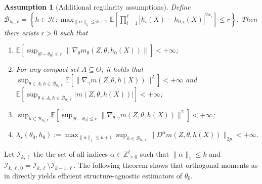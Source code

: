\documentclass{article}
\def\gB{{\mathcal{B}}}
\def\gH{{\mathcal{H}}}
\def\gI{{\mathcal{I}}}
\newcommand{\E}{\mathbb{E}}
\newtheorem{assumption}{Assumption}[section]
\begin{document}
\begin{assumption}[Additional regularity assumptions]
    \label{asmp:higher-order-regularity}
    Define $\gB_{h_0,r} = \left\{h\in\gH: \max_{\|\alpha\|_1\leq k+1} \E\left[ \prod_{i=1}^{\ell} |h_i(X)-h_{0,i}(X)|^{2\alpha_i} \right] \leq r \right\}$. Then there exists $r>0$ such that
    \begin{enumerate}[(1).]
        \item $\E\left[ \sup_{|\theta-\theta_0|\leq r} \left\|\nabla_{\theta} m_{\theta}(Z,\theta,h_0(X))\right\| \right] < +\infty$;
        \item For any compact set $A\subseteq\Theta$, it holds that $\sup_{\theta\in A, h\in\gB_{h_0,r}} \E\left[ \|\nabla_{\gamma} m(Z,\theta,h(X))\|^2 \right] < +\infty$ and $\E\left[ \sup_{\theta\in A, h\in\gB_{h_0,r}} \left| m(Z,\theta,h(X))\right| \right] < +\infty$;
        \item $\sup_{h\in\gB_{h_0,r}}\E\left[ \sup_{|\theta-\theta_0|\leq r} \|\nabla_{\theta,\gamma} m(Z,\theta,h(X))\|^2 \right] < +\infty$;
        \item $\lambda_{\star}(\theta_0,h_0) := \max_{\|\alpha\|_1\leq k+1}\sup_{h\in\gB_{h_0,r}} \|D^{\alpha}m(Z,\theta,h(X))\|_{2p} < +\infty$.
    \end{enumerate}
\end{assumption}

Let $\gI_{k,\ell}$ the the set of all indices $\alpha\in\mathbb{Z}_{\geq 0}^\ell$ such that $\|\alpha\|_1\leq k$ and $\gI_{k,\ell,0} = \gI_{k,\ell}\setminus \gI_{k-1,\ell}$.
The following theorem shows that orthogonal moments as in  directly yields efficient structure-agnostic estimators of $\theta_0$.
\end{document}
